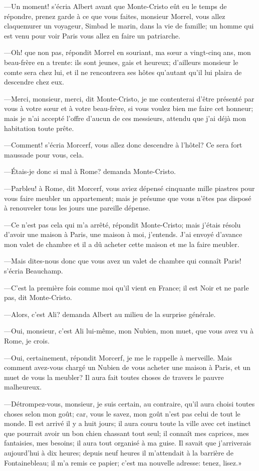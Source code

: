 —Un moment! s'écria Albert avant que Monte-Cristo eût eu le temps de répondre, prenez garde à ce que vous faites, monsieur Morrel, vous allez claquemurer un voyageur, Simbad le marin, dans la vie de famille; un homme qui est venu pour voir Paris vous allez en faire un patriarche.  

—Oh! que non pas, répondit Morrel en souriant, ma sœur a vingt-cinq ans, mon beau-frère en a trente: ils sont jeunes, gais et heureux; d'ailleurs monsieur le comte sera chez lui, et il ne rencontrera ses hôtes qu'autant qu'il lui plaira de descendre chez eux. 

—Merci, monsieur, merci, dit Monte-Cristo, je me contenterai d'être présenté par vous à votre sœur et à votre beau-frère, si vous voulez bien me faire cet honneur; mais je n'ai accepté l'offre d'aucun de ces messieurs, attendu que j'ai déjà mon habitation toute prête. 

—Comment! s'écria Morcerf, vous allez donc descendre à l'hôtel? Ce sera fort maussade pour vous, cela. 

—Étais-je donc si mal à Rome? demanda Monte-Cristo. 

—Parbleu! à Rome, dit Morcerf, vous aviez dépensé cinquante mille piastres pour vous faire meubler un appartement; mais je présume que vous n'êtes pas disposé à renouveler tous les jours une pareille dépense. 

—Ce n'est pas cela qui m'a arrêté, répondit Monte-Cristo; mais j'étais résolu d'avoir une maison à Paris, une maison à moi, j'entends. J'ai envoyé d'avance mon valet de chambre et il a dû acheter cette maison et me la faire meubler. 

—Mais dites-nous donc que vous avez un valet de chambre qui connaît Paris! s'écria Beauchamp. 

—C'est la première fois comme moi qu'il vient en France; il est Noir et ne parle pas, dit Monte-Cristo. 

—Alors, c'est Ali? demanda Albert au milieu de la surprise générale. 

—Oui, monsieur, c'est Ali lui-même, mon Nubien, mon muet, que vous avez vu à Rome, je crois. 

—Oui, certainement, répondit Morcerf, je me le rappelle à merveille. Mais comment avez-vous chargé un Nubien de vous acheter une maison à Paris, et un muet de vous la meubler? Il aura fait toutes choses de travers le pauvre malheureux. 

—Détrompez-vous, monsieur, je suis certain, au contraire, qu'il aura choisi toutes choses selon mon goût; car, vous le savez, mon goût n'est pas celui de tout le monde. Il est arrivé il y a huit jours; il aura couru toute la ville avec cet instinct que pourrait avoir un bon chien chassant tout seul; il connaît mes caprices, mes fantaisies, mes besoins; il aura tout organisé à ma guise. Il savait que j'arriverais aujourd'hui à dix heures; depuis neuf heures il m'attendait à la barrière de Fontainebleau; il m'a remis ce papier; c'est ma nouvelle adresse: tenez, lisez.» 

